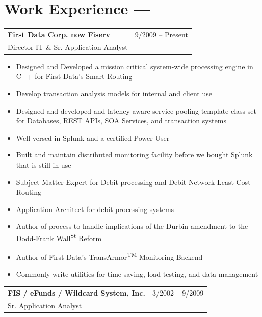 \documentclass[10pt]{report}
\begin{document}
\pagebreak

\section*{Work Experience ---}

\noindent
\begin{tabular}{ L{.5\textwidth}  R{.4\textwidth} }
\textbf{\large First Data Corp. now Fiserv} & 9/2009 -- Present \\
Director IT \& Sr. Application Analyst &
\end{tabular}


\begin{itemize}
\item Designed and Developed a mission critical system-wide processing engine in C++ for First Data's Smart Routing
\item Develop transaction analysis models for internal and client use
\item Designed and developed and latency aware service pooling template class set for Databases, REST APIs, SOA Services, and transaction systems
\item Well versed in Splunk and a certified Power User
\item Built and maintain distributed monitoring facility before we bought Splunk that is still in use
\item Subject Matter Expert for Debit processing and Debit Network Least Cost Routing
\item Application Architect for debit processing systems
\item Author of process to handle implications of the Durbin amendment to the Dodd-Frank Wall\textsuperscript{\tiny St} Reform
\item Author of First Data's TransArmor\textsuperscript{\tiny TM} Monitoring Backend
\item Commonly write utilities for time saving, load testing, and data management
\end{itemize}
\bigskip

\noindent
\begin{tabular}{ L{.5\textwidth}  R{.4\textwidth} }
\textbf{\large FIS / eFunds / Wildcard System, Inc.} & 3/2002 -- 9/2009 \\
Sr. Application Analyst &
\end{tabular}
\end{document}
